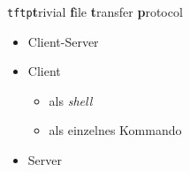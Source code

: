 \documentclass{beamer}
\begin{document}
\begin{frame}{\tt tftp}{{\bf t}rivial {\bf f}ile {\bf t}ransfer {\bf p}rotocol}
 \begin{itemize}
  \item Client-Server
  \item Client 
  \begin{itemize}
   \item als {\em shell}
   \item als einzelnes Kommando 
   
  \end{itemize}
   \item Server
   
 \end{itemize}
\end{frame}
\end{document}
